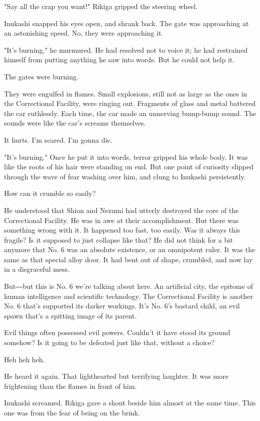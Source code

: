 "Say all the crap you want!" Rikiga gripped the steering wheel.

Inukashi snapped his eyes open, and shrank back. The gate was
approaching at an astonishing speed. No, they were approaching it.

"It's burning," he murmured. He had resolved not to voice it; he had
restrained himself from putting anything he saw into words. But he could
not help it.

The gates were burning.

They were engulfed in flames. Small explosions, still not as large as
the ones in the Correctional Facility, were ringing out. Fragments of
glass and metal battered the car ruthlessly. Each time, the car made an
unnerving bump-bump sound. The sounds were like the car's screams
themselves.

It hurts. I'm scared. I'm gonna die.

"It's burning." Once he put it into words, terror gripped his whole
body. It was like the roots of his hair were standing on end. But one
point of curiosity slipped through the wave of fear washing over him,
and clung to Inukashi persistently.

How can it crumble so easily?

He understood that Shion and Nezumi had utterly destroyed the core of
the Correctional Facility. He was in awe at their accomplishment. But
there was something wrong with it. It happened too fast, too easily. Was
it always this fragile? Is it supposed to just collapse like that? He
did not think for a bit anymore that No. 6 was an absolute existence, or
an omnipotent ruler. It was the same as that special alloy door. It had
bent out of shape, crumbled, and now lay in a disgraceful mess.

But―but this is No. 6 we're talking about here. An artificial city, the
epitome of human intelligence and scientific technology. The
Correctional Facility is another No. 6 that's supported its darker
workings. It's No. 6's bastard child, an evil spawn that's a spitting
image of its parent.

Evil things often possessed evil powers. Couldn't it have stood its
ground somehow? Is it going to be defeated just like that, without a
choice?

Heh heh heh.

He heard it again. That lighthearted but terrifying laughter. It was
more frightening than the flames in front of him.

Inukashi screamed. Rikiga gave a shout beside him almost at the same
time. This one was from the fear of being on the brink.


